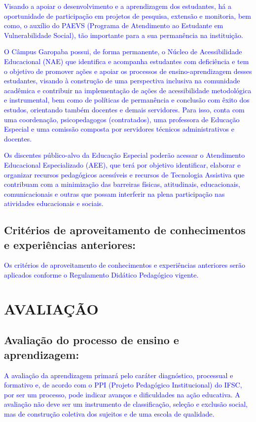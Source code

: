 \documentclass{../../modelos/latex-shared/ifsc-ppc}
\newcommand{\revisao}[1]{\textcolor{blue}{#1}}
\newcommand{\revisao}[1]{#1}
\begin{document}
\revisao{Visando a apoiar o desenvolvimento e a aprendizagem dos estudantes, há a oportunidade de participação em projetos de pesquisa, extensão e monitoria, bem como, o auxílio do PAEVS (Programa de Atendimento ao Estudante em Vulnerabilidade Social), tão importante para a sua permanência na instituição.}

\revisao{O Câmpus Garopaba possui, de forma permanente, o Núcleo de Acessibilidade Educacional (NAE) que identifica e acompanha estudantes com deficiência e tem o objetivo de promover ações e apoiar os processos de ensino-aprendizagem desses estudantes, visando à construção de uma perspectiva inclusiva na comunidade acadêmica e contribuir na implementação de ações de acessibilidade metodológica e instrumental, bem como de políticas de permanência e conclusão com êxito dos estudos, orientando também docentes e demais servidores. Para isso, conta com uma coordenação, psicopedagogos (contratados), uma professora de Educação Especial e uma comissão composta por servidores técnicos administrativos e docentes.}

\revisao{Os discentes público-alvo da Educação Especial poderão acessar o Atendimento Educacional Especializado (AEE), que terá por objetivo identificar, elaborar e organizar recursos pedagógicos acessíveis e recursos de Tecnologia Assistiva que contribuam com a minimização das barreiras físicas, atitudinais, educacionais, comunicacionais e outras que possam interferir na plena participação nas atividades educacionais e sociais.}

\subsection{Critérios de aproveitamento de conhecimentos e experiências anteriores:}
\revisao{Os critérios de aproveitamento de conhecimentos e experiências anteriores serão aplicados conforme o Regulamento Didático Pedagógico vigente.}

\section{AVALIAÇÃO}
\subsection{Avaliação do processo de ensino e aprendizagem:}
\revisao{A avaliação da aprendizagem primará pelo caráter diagnóstico, processual e formativo e, de acordo com o PPI (Projeto Pedagógico Institucional) do IFSC, por ser um processo, pode indicar avanços e dificuldades na ação educativa. A avaliação não deve ser um instrumento de classificação, seleção e exclusão social, mas de construção coletiva dos sujeitos e de uma escola de qualidade.}
\end{document}
